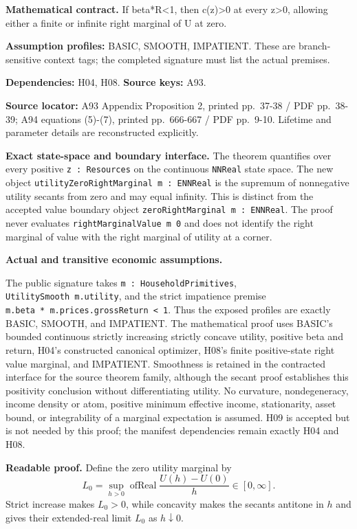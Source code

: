 \documentclass[
  11pt,
]{article}
\let\LedgerOriginalTexttt\texttt
\renewcommand{\texttt}[1]{{\small\LedgerOriginalTexttt{#1}}}
\begin{document}
\textbf{Mathematical contract.} If beta*R\textless1, then
c(z)\textgreater0 at every z\textgreater0, allowing either a finite or
infinite right marginal of U at zero.

\textbf{Assumption profiles:} BASIC, SMOOTH, IMPATIENT. These are
branch-sensitive context tags; the completed signature must list the
actual premises.

\textbf{Dependencies:} H04, H08. \textbf{Source keys:} A93.

\textbf{Source locator:} A93 Appendix Proposition 2, printed pp.~37-38 /
PDF pp.~38-39; A94 equations (5)-(7), printed pp.~666-667 / PDF
pp.~9-10. Lifetime and parameter details are reconstructed explicitly.

\textbf{Exact state-space and boundary interface.} The theorem
quantifies over every positive \texttt{z\ :\ Resources} on the
continuous \texttt{NNReal} state space. The new object
\texttt{utilityZeroRightMarginal\ m\ :\ ENNReal} is the supremum of
nonnegative utility secants from zero and may equal infinity. This is
distinct from the accepted value boundary object
\texttt{zeroRightMarginal\ m\ :\ ENNReal}. The proof never evaluates
\texttt{rightMarginalValue\ m\ 0} and does not identify the right
marginal of value with the right marginal of utility at a corner.

\textbf{Actual and transitive economic assumptions.}

The public signature takes \texttt{m\ :\ HouseholdPrimitives},
\texttt{UtilitySmooth\ m.utility}, and the strict impatience premise
\texttt{m.beta\ *\ m.prices.grossReturn\ \textless{}\ 1}. Thus the
exposed profiles are exactly BASIC, SMOOTH, and IMPATIENT. The
mathematical proof uses BASIC's bounded continuous strictly increasing
strictly concave utility, positive beta and return, H04's constructed
canonical optimizer, H08's finite positive-state right value marginal,
and IMPATIENT. Smoothness is retained in the contracted interface for
the source theorem family, although the secant proof establishes this
positivity conclusion without differentiating utility. No curvature,
nondegeneracy, income density or atom, positive minimum effective
income, stationarity, asset bound, or integrability of a marginal
expectation is assumed. H09 is accepted but is not needed by this proof;
the manifest dependencies remain exactly H04 and H08.

\textbf{Readable proof.} Define the zero utility marginal by \[
 L_0=\sup_{h>0}\operatorname{ofReal}
       \frac{U(h)-U(0)}h\in[0,\infty].
\] Strict increase makes \(L_0>0\), while concavity makes the secants
antitone in \(h\) and gives their extended-real limit \(L_0\) as
\(h\downarrow0\).
\end{document}
